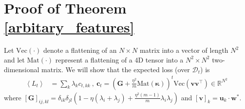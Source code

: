 \documentclass{article} %
\def\w{\bm w}
\def\w{\mathbf w}
\def\u{\mathbf u}
\def\G{\mathbf G}
\begin{document}

\section{Proof of Theorem \ref{arbitary_features}}\label{non_gauss}

Let $\text{Vec}(\cdot)$ denote a flattening of an $N\times N$ matrix into a vector of length $N^2$ and let $\text{Mat}(\cdot)$ represent a flattening of a 4D tensor into a $N^2 \times N^2$ two-dimensional matrix. We will show that the expected loss (over $\mathcal D_t$) is 
\begin{align}
    \left< L_t \right> &= \sum_{k} \lambda_k c_{t,kk}  \ , \ \mathbf{c}_{t}=\left( \G + \frac{\eta^2}{m} \text{Mat}(\bm\kappa) \right)^t \text{Vec}(\mathbf{v}\mathbf{v}^\top) \in \mathbb{R}^{N^2} 
\end{align}
where $\left[ \mathbf{G} \right]_{ij, kl} = \delta_{ik}\delta_{jl} \left(1 - \eta(\lambda_i + \lambda_j) + \frac{\eta^2(m-1)}{m} \lambda_i \lambda_j \right)$ and $[\mathbf{v}]_k = \u_k \cdot \w^*. $
\end{document}
